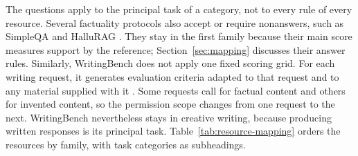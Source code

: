 \documentclass{clv2025}
\begin{document}
The questions apply to the principal task of a category, not to every
rule of every resource. Several factuality protocols also accept or require
nonanswers, such as SimpleQA and HalluRAG
\citep{wei_measuring_2024,ridder_hallurag_2025}. They stay in the first
family because their main score measures support by the reference;
Section~\ref{sec:mapping} discusses their answer rules. Similarly,
WritingBench does not apply one fixed scoring grid. For each writing
request, it generates evaluation criteria adapted to that request and to
any material supplied with it \citep{wu_writingbench_2025}. Some requests
call for factual content and others for invented content, so the
permission scope changes from one request to the next. WritingBench
nevertheless stays in creative writing, because producing written
responses is its principal task.
Table~\ref{tab:resource-mapping} orders the resources by family, with task
categories as subheadings.
\end{document}
